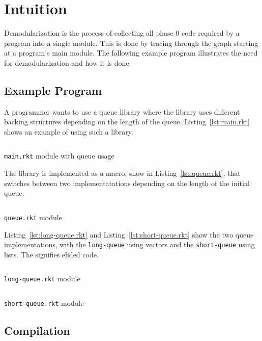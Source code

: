 \chapter{Intuition}
\label{chap:intuition}
Demodularization is the process of collecting all phase 0 code required by a program into a single module.
This is done by tracing through the  graph starting at a program's main module.
The following example program illustrates the need for demodularization and how it is done.

\section{Example Program}
A programmer wants to use a queue library where the library uses different backing structures depending on the length of the queue. 
Listing~\ref{lst:main.rkt} shows an example of using such a library.
\begin{listing}
  \inputminted{racket}{listings/main.rkt}
  \caption{\texttt{main.rkt} module with queue usage}
  \label{lst:main.rkt}
\end{listing}
The library is implemented as a macro, show in Listing~\ref{lst:queue.rkt}, that switches between two implementatations depending on the length of the initial queue.
\begin{listing}
  \inputminted{racket}{listings/queue.rkt}
  \caption{\texttt{queue.rkt} module}
  \label{lst:queue.rkt}
\end{listing}
Listing~\ref{lst:long-queue.rkt} and Listing~\ref{lst:short-queue.rkt} show the two queue implementations, with the \texttt{long-queue} using vectors and the \texttt{short-queue} using lists. 
The  signifies elided code.

\begin{listing}
  \inputminted{racket}{listings/long-queue.rkt}
  \caption{\texttt{long-queue.rkt} module}
  \label{lst:long-queue.rkt}
\end{listing}

\begin{listing}
  \inputminted{racket}{listings/short-queue.rkt}
  \caption{\texttt{short-queue.rkt} module}
  \label{lst:short-queue.rkt}
\end{listing}


\section{Compilation}

